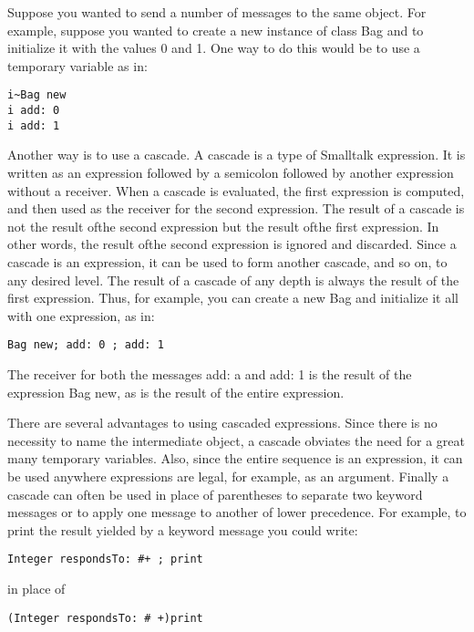 
Suppose you wanted to send a number of messages to the same object. For example,
suppose you wanted to create a new instance of class Bag and to initialize it
with the values 0 and 1. One way to do this would be to use a temporary variable
as in:
\begin{lstlisting}
i~Bag new
i add: 0
i add: 1
\end{lstlisting}

Another way is to use a cascade. A cascade is a type of Smalltalk
expression. It is written as an expression followed by a semicolon followed by
another expression without a receiver. When a cascade is evaluated, the first
expression is computed, and then used as the receiver for the second expression.
The result of a cascade is not the result ofthe second expression but the result
ofthe first expression. In other words, the result ofthe second expression is
ignored and discarded. Since a cascade is an expression, it can be used to form
another cascade, and so on, to any desired level. The result of a cascade of any
depth is always the result of the first expression. Thus, for example, you can
create a new Bag and initialize it all with one expression, as in:
\begin{lstlisting}
Bag new; add: 0 ; add: 1
\end{lstlisting}
The receiver for both the messages add: a and add: 1 is the result of the
expression Bag new, as is the result of the entire expression.

There are several advantages to using cascaded expressions. Since
there is no necessity to name the intermediate object, a cascade obviates
the need for a great many temporary variables. Also, since the entire sequence is an expression, it can be used anywhere expressions are legal,
for example, as an argument. Finally a cascade can often be used in place
of parentheses to separate two keyword messages or to apply one message
to another of lower precedence. For example, to print the result yielded
by a keyword message you could write:
\begin{lstlisting}
Integer respondsTo: #+ ; print
\end{lstlisting}
in place of
\begin{lstlisting}
(Integer respondsTo: # +)print
\end{lstlisting}
